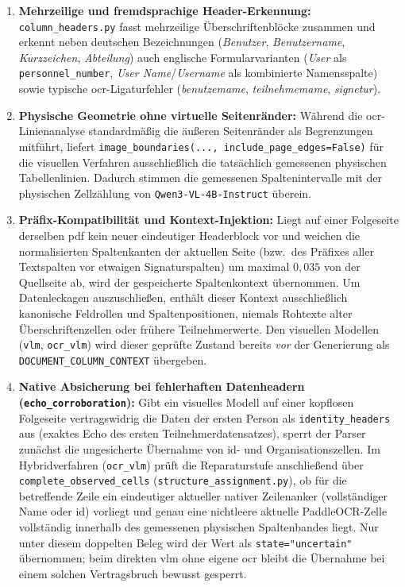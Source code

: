 \begin{enumerate}
  \item \textbf{Mehrzeilige und fremdsprachige Header-Erkennung:} \texttt{column\_headers.py} fasst mehrzeilige Überschriftenblöcke zusammen und erkennt neben deutschen Bezeichnungen (\emph{Benutzer}, \emph{Benutzername}, \emph{Kurzzeichen}, \emph{Abteilung}) auch englische Formularvarianten (\emph{User} als \texttt{personnel\_number}, \emph{User Name}/\emph{Username} als kombinierte Namensspalte) sowie typische \ac{ocr}-Ligaturfehler (\emph{benutzemame}, \emph{teilnehmemame}, \emph{signetur}).
  \item \textbf{Physische Geometrie ohne virtuelle Seitenränder:} Während die \ac{ocr}-Linienanalyse standardmäßig die äußeren Seitenränder als Begrenzungen mitführt, liefert \texttt{image\_boundaries(..., include\_page\_edges=False)} für die visuellen Verfahren ausschließlich die tatsächlich gemessenen physischen Tabellenlinien. Dadurch stimmen die gemessenen Spaltenintervalle mit der physischen Zellzählung von \texttt{Qwen3-VL-4B-Instruct} überein.
  \item \textbf{Präfix-Kompatibilität und Kontext-Injektion:} Liegt auf einer Folgeseite derselben \ac{pdf} kein neuer eindeutiger Headerblock vor und weichen die normalisierten Spaltenkanten der aktuellen Seite (bzw.\ des Präfixes aller Textspalten vor etwaigen Signaturspalten) um maximal $0{,}035$ von der Quellseite ab, wird der gespeicherte Spaltenkontext übernommen. Um Datenleckagen auszuschließen, enthält dieser Kontext ausschließlich kanonische Feldrollen und Spaltenpositionen, niemals Rohtexte alter Überschriftenzellen oder frühere Teilnehmerwerte. Den visuellen Modellen (\texttt{vlm}, \texttt{ocr\_vlm}) wird dieser geprüfte Zustand bereits \emph{vor} der Generierung als \texttt{DOCUMENT\_COLUMN\_CONTEXT} übergeben.
  \item \textbf{Native Absicherung bei fehlerhaften Datenheadern (\texttt{echo\_corroboration}):} Gibt ein visuelles Modell auf einer kopflosen Folgeseite vertragswidrig die Daten der ersten Person als \texttt{identity\_headers} aus (exaktes Echo des ersten Teilnehmerdatensatzes), sperrt der Parser zunächst die ungesicherte Übernahme von \ac{id}- und Organisationszellen. Im Hybridverfahren (\texttt{ocr\_vlm}) prüft die Reparaturstufe anschließend über \texttt{complete\_observed\_cells} (\texttt{structure\_assignment.py}), ob für die betreffende Zeile ein eindeutiger aktueller nativer Zeilenanker (vollständiger Name oder \ac{id}) vorliegt und genau eine nichtleere aktuelle PaddleOCR-Zelle vollständig innerhalb des gemessenen physischen Spaltenbandes liegt. Nur unter diesem doppelten Beleg wird der Wert als \texttt{state="uncertain"} übernommen; beim direkten \ac{vlm} ohne eigene \ac{ocr} bleibt die Übernahme bei einem solchen Vertragsbruch bewusst gesperrt.
\end{enumerate}


